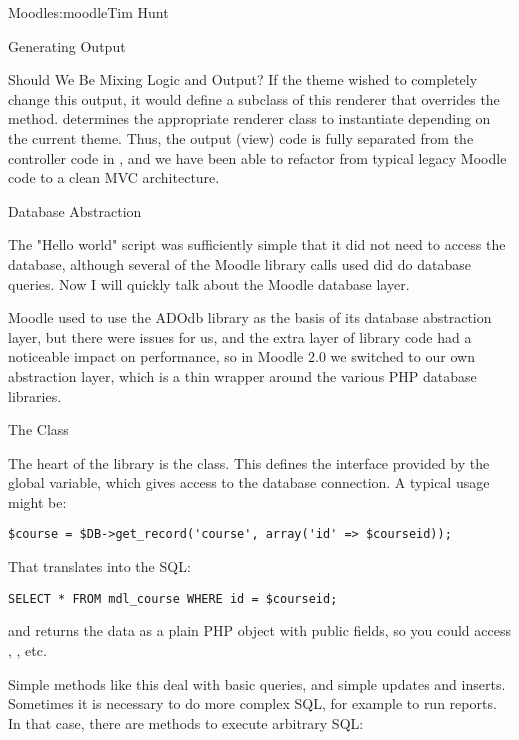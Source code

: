 \begin{aosachapter}{Moodle}{s:moodle}{Tim Hunt}
\begin{aosasect1}{Generating Output}
\begin{aosasect2}{Should We Be Mixing Logic and Output?}
If the theme wished to completely change this output, it would define
a subclass of this renderer that overrides the 
method.  determines the
appropriate renderer class to instantiate depending on the current
theme. Thus, the output (view) code is fully separated from the
controller code in , and we have been able to refactor
from typical legacy Moodle code to a clean MVC architecture.

\end{aosasect2}

\end{aosasect1}

\begin{aosasect1}{Database Abstraction}

The "Hello world" script was sufficiently simple that it did not need to
access the database, although several of the Moodle library calls used
did do database queries. Now I will quickly talk about the Moodle
database layer.

Moodle used to use the ADOdb library as the basis of its database
abstraction layer, but there were issues for us, and the extra layer
of library code had a noticeable impact on performance, so in Moodle
2.0 we switched to our own abstraction layer, which is a thin wrapper
around the various PHP database libraries.

\begin{aosasect2}{The  Class}

The heart of the library is the  class. This
defines the interface provided by the  global variable,
which gives access to the database connection. A typical usage might
be:

\begin{verbatim}
$course = $DB->get_record('course', array('id' => $courseid));
\end{verbatim}

\noindent That translates into the SQL:

\begin{verbatim}
SELECT * FROM mdl_course WHERE id = $courseid;
\end{verbatim}

\noindent and returns the data as a plain PHP object with public fields, so you
could access ,
, etc.

Simple methods like this deal with basic queries, and simple updates
and inserts. Sometimes it is necessary to do more complex SQL, for
example to run reports. In that case, there are methods to execute
arbitrary SQL:


\end{aosasect2}
\end{aosasect1}
\end{aosachapter}
